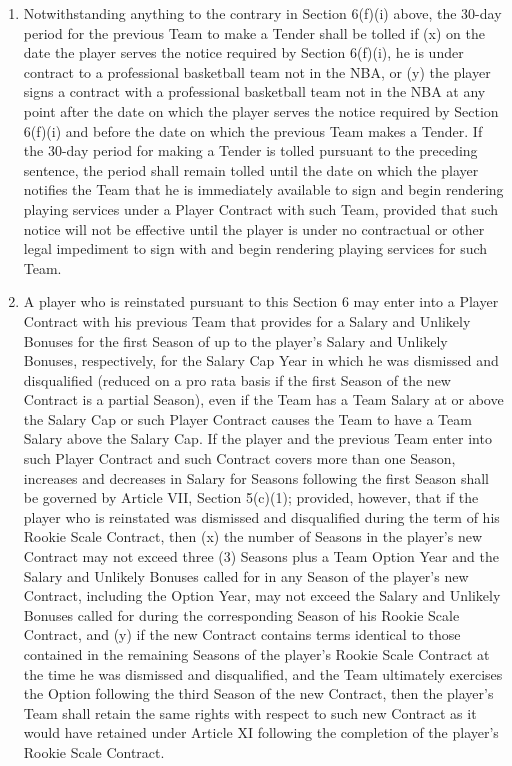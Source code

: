 \documentclass[
]{book}
\begin{document}
\begin{enumerate}
\begin{enumerate}
  \item
    Notwithstanding anything to the contrary in Section 6(f)(i) above, the 30-day period for the previous Team to make a Tender shall be tolled if (x) on the date the player serves the notice required by Section 6(f)(i), he is under contract to a professional basketball team not in the NBA, or (y) the player signs a contract with a professional basketball team not in the NBA at any point after the date on which the player serves the notice required by Section 6(f)(i) and before the date on which the previous Team makes a Tender. If the 30-day period for making a Tender is tolled pursuant to the preceding sentence, the period shall remain tolled until the date on which the player notifies the Team that he is immediately available to sign and begin rendering playing services under a Player Contract with such Team, provided that such notice will not be effective until the player is under no contractual or other legal impediment to sign with and begin rendering playing services for such Team.
  \item
    A player who is reinstated pursuant to this Section 6 may enter into a Player Contract with his previous Team that provides for a Salary and Unlikely Bonuses for the first Season of up to the player's Salary and Unlikely Bonuses, respectively, for the Salary Cap Year in which he was dismissed and disqualified (reduced on a pro rata basis if the first Season of the new Contract is a partial Season), even if the Team has a Team Salary at or above the Salary Cap or such Player Contract causes the Team to have a Team Salary above the Salary Cap. If the player and the previous Team enter into such Player Contract and such Contract covers more than one Season, increases and decreases in Salary for Seasons following the first Season shall be governed by Article VII, Section 5(c)(1); provided, however, that if the player who is reinstated was dismissed and disqualified during the term of his Rookie Scale Contract, then (x) the number of Seasons in the player's new Contract may not exceed three (3) Seasons plus a Team Option Year and the Salary and Unlikely Bonuses called for in any Season of the player's new Contract, including the Option Year, may not exceed the Salary and Unlikely Bonuses called for during the corresponding Season of his Rookie Scale Contract, and (y) if the new Contract contains terms identical to those contained in the remaining Seasons of the player's Rookie Scale Contract at the time he was dismissed and disqualified, and the Team ultimately exercises the Option following the third Season of the new Contract, then the player's Team shall retain the same rights with respect to such new Contract as it would have retained under Article XI following the completion of the player's Rookie Scale Contract.
  \end{enumerate}
\end{enumerate}
\end{document}

